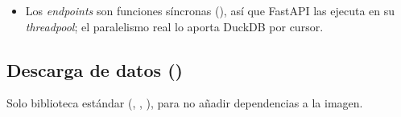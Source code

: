 \begin{itemize}
\begin{itemize}
\item {}: \textbf{intercambio atómico de versión}: abre la nueva conexión y la publica; las consultas en curso siguen con su cursor de la conexión antigua.
\item {} cierra las conexiones retiradas;  cierra todo.
\end{itemize}
\item Los \emph{endpoints} son funciones síncronas (), así que FastAPI las ejecuta en su \emph{threadpool}; el paralelismo real lo aporta DuckDB por cursor.
\end{itemize}

\subsection{Descarga de datos ()}

Solo biblioteca estándar (, , ), para no añadir dependencias a la imagen.

